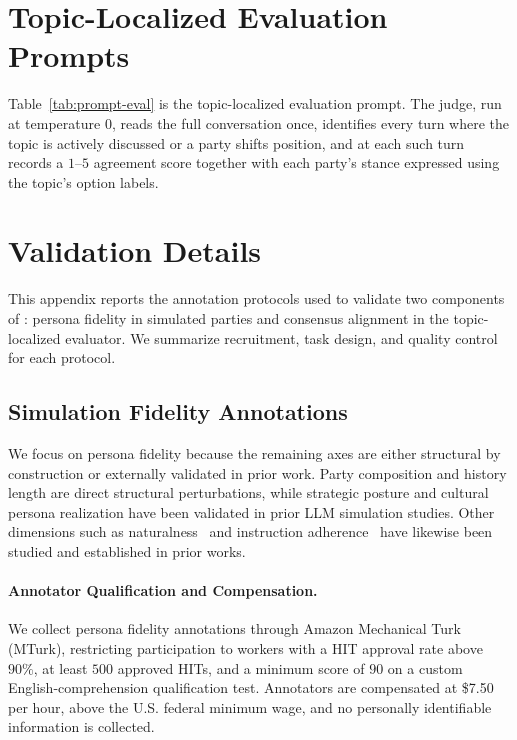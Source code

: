 \section{Topic-Localized Evaluation Prompts}
\label{app:evaluator_detail}
Table~\ref{tab:prompt-eval} is the topic-localized evaluation prompt. The judge, run at temperature $0$, reads the full conversation once, identifies every turn where the topic is actively discussed or a party shifts position, and at each such turn records a $1$--$5$ agreement score together with each party's stance expressed using the topic's option labels.




\section{Validation Details}
\label{app:validation_detail}

This appendix reports the annotation protocols used to validate two components of \algname{}: persona fidelity in simulated parties and consensus alignment in the topic-localized evaluator. We summarize recruitment, task design, and quality control for each protocol.

\subsection{Simulation Fidelity Annotations}
\label{app:simulation_validation_detail}
We focus on persona fidelity because the remaining axes are either structural by construction or externally validated in prior work. Party composition and history length are direct structural perturbations, while strategic posture \citep{chen2026simulating, liu2025promediate} and cultural persona realization \citep{dey2025can} have been validated in prior LLM simulation studies. Other dimensions such as naturalness~\citep{liu2025promediate} and instruction adherence~\citep{vaccaro2025advancing} have likewise been studied and established in prior works.



\paragraph{Annotator Qualification and Compensation.}
We collect persona fidelity annotations through Amazon Mechanical Turk (MTurk), restricting participation to workers with a HIT approval rate above $90\%$, at least $500$ approved HITs, and a minimum score of $90$ on a custom English-comprehension qualification test. Annotators are compensated at \$7.50 per hour, above the U.S. federal minimum wage, and no personally identifiable information is collected.

